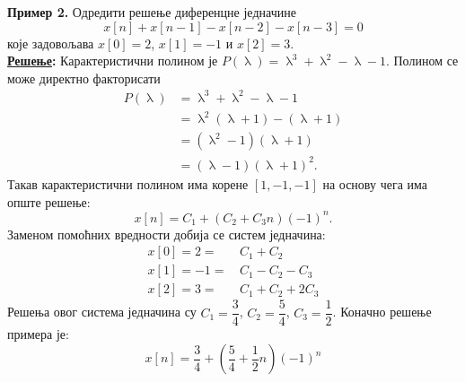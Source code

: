 \noindent
\textbf{Пример 2.} Одредити решење диференцне једначине
\begin{equation}
x[n] + x[n-1] - x[n-2] - x[n-3] = 0
\end{equation}
које задовољава $x[0] = 2$, $x[1] = -1$ и 
$x[2] = 3$. \\[2mm]
\textbf{\underline{Решење}:} Карактеристични полином
је $P(\uplambda) = \uplambda^3 + \uplambda^2 
- \uplambda - 1$. Полином се може директно факторисати
\begin{align}
P(\uplambda) & = \uplambda^3 + \uplambda^2 
- \uplambda - 1 \\
& = \uplambda^2 (\uplambda + 1) 
- (\uplambda + 1) \\
& = (\uplambda^2 - 1) (\uplambda + 1) \\
& = (\uplambda - 1) (\uplambda + 1)^2. 
\end{align}
Такав карактеристични полином има корене 
$[1, -1, -1]$ на основу чега има опште решење: 
\begin{equation}
x[n] = C_1 + (C_2 + C_3 n) (-1)^n.
\end{equation}
Заменом помоћних вредности добија се систем 
једначина:
\begin{align*}
x[0] = 2 =&\, C_1 + C_2 \\
x[1] = -1 =&\, C_1 - C_2 - C_3 \\
x[2] = 3 =&\, C_1 + C_2 + 2C_3
\end{align*}
Решења овог система једначина су 
$C_1 = \dfrac{3}{4}$, $C_2 = \dfrac{5}{4}$, 
$C_3 = \dfrac{1}{2}$. Коначно решење примера је:
\begin{equation}
x[n] = \dfrac{3}{4} + \left( \dfrac{5}{4} + 
\dfrac{1}{2} n \right) (-1)^n
\end{equation}
